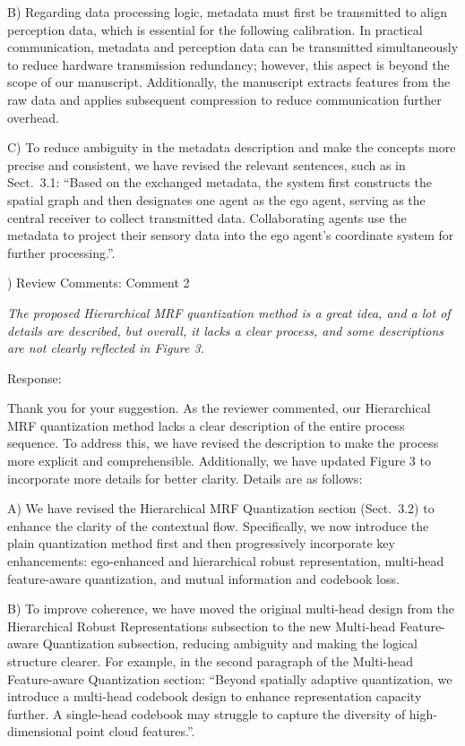 \documentclass[12pt,a4paper]{article}
\begin{document}
B) Regarding data processing logic, metadata must first be transmitted to align perception data, which is essential for the following calibration.
In practical communication, metadata and perception data can be transmitted simultaneously to reduce hardware transmission redundancy; however, this aspect is beyond the scope of our manuscript.
Additionally, the manuscript extracts features from the raw data and applies subsequent compression to reduce communication further overhead.

C) To reduce ambiguity in the metadata description and make the concepts more precise and consistent, we have revised the relevant sentences, such as in Sect.~3.1: ``Based on the exchanged metadata, the system first constructs the spatial graph and then designates one agent as the ego agent, serving as the central receiver to collect transmitted data. Collaborating agents use the metadata to project their sensory data into the ego agent's coordinate system for further processing.''.


\vspace{4ex}
) Review Comments: Comment 2

\textit{The proposed Hierarchical MRF quantization method is a great idea, and a lot of details are described, but overall, it lacks a clear process, and some descriptions are not clearly reflected in Figure 3.}

\noindent Response:

Thank you for your suggestion. As the reviewer commented, our Hierarchical MRF quantization method lacks a clear description of the entire process sequence. To address this, we have revised the description to make the process more explicit and comprehensible. Additionally, we have updated Figure 3 to incorporate more details for better clarity.
Details are as follows:

A) We have revised the Hierarchical MRF Quantization section (Sect.~3.2) to enhance the clarity of the contextual flow. Specifically, we now introduce the plain quantization method first and then progressively incorporate key enhancements: ego-enhanced and hierarchical robust representation, multi-head feature-aware quantization, and mutual information and codebook loss.

B) To improve coherence, we have moved the original multi-head design from the Hierarchical Robust Representations subsection to the new Multi-head Feature-aware Quantization subsection, reducing ambiguity and making the logical structure clearer. For example, in the second paragraph of the Multi-head Feature-aware Quantization section:
``Beyond spatially adaptive quantization, we introduce a multi-head codebook design to enhance representation capacity further. A single-head codebook may struggle to capture the diversity of high-dimensional point cloud features.''.
\end{document}
